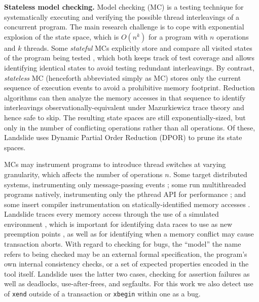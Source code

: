 \documentclass[10pt]{sigplanconf}
\begin{document}
{\bf Stateless model checking.}
Model checking (MC) \cite{verisoft} is a testing technique for systematically executing and verifying
the possible thread interleavings of a concurrent program.
The main research challenge is to cope with exponential explosion of the state space,
which is $O(n^k)$ for a program with $n$ operations and $k$ threads.
Some {\em stateful} MCs explicitly store and compare all visited states of the program being tested \cite{spin},
which both keeps track of test coverage
and allows identifying identical states to avoid testing redundant interleavings.
%
By contrast, {\em stateless} MC (henceforth abbreviated simply as MC)
stores only the current sequence of execution events to avoid a prohibitive memory footprint.
Reduction algorithms \cite{dpor,optimal-dpor,satcheck,mcr,mcr,tsopso}
can then analyze the memory accesses in that sequence to identify
interleavings observationally-equivalent under Mazurkiewicz trace theory \cite{mazurkiewicz} and hence safe to skip.
The resulting state spaces are still exponentially-sized,
but only in the number of conflicting operations rather than all operations.
Of these, Landslide uses Dynamic Partial Order Reduction (DPOR) \cite{dpor} to prune its state spaces.

MCs may instrument programs to introduce thread switches at varying granularity, which affects the number of operations $n$.
Some target distributed systems, instrumenting only message-passing events \cite{modist};
some run multithreaded programs natively, instrumenting only the pthread API for performance \cite{dbug-ssv};
and some insert compiler instrumentation on statically-identified memory accesses \cite{chess,inspect}.
Landslide traces every memory access through the use of a simulated environment \cite{bochs},
which is important for identifying data races to use as new preemption points \cite{quicksand},
as well as for identifying when a memory conflict may cause transaction aborts.
With regard to checking for bugs,
the ``model'' the name refers to being checked may be
an external formal specification,
the program's own internal consistency checks,
or a set of expected properties encoded in the tool itself.
Landslide uses the latter two cases, checking for assertion failures
as well as deadlocks, use-after-frees, and segfaults.
For this work we also detect use of {\tt xend} outside of a transaction
or {\tt xbegin} within one as a bug.

\end{document}
